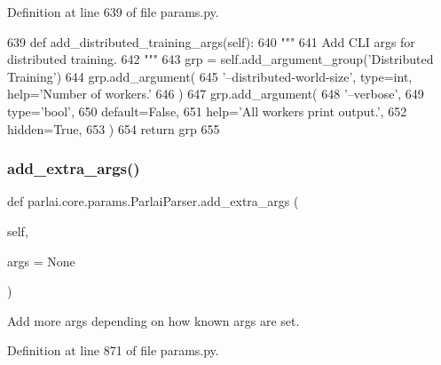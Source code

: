 Definition at line 639 of file params.\+py.


\begin{DoxyCode}
639     \textcolor{keyword}{def }add\_distributed\_training\_args(self):
640         \textcolor{stringliteral}{"""}
641 \textcolor{stringliteral}{        Add CLI args for distributed training.}
642 \textcolor{stringliteral}{        """}
643         grp = self.add\_argument\_group(\textcolor{stringliteral}{'Distributed Training'})
644         grp.add\_argument(
645             \textcolor{stringliteral}{'--distributed-world-size'}, type=int, help=\textcolor{stringliteral}{'Number of workers.'}
646         )
647         grp.add\_argument(
648             \textcolor{stringliteral}{'--verbose'},
649             type=\textcolor{stringliteral}{'bool'},
650             default=\textcolor{keyword}{False},
651             help=\textcolor{stringliteral}{'All workers print output.'},
652             hidden=\textcolor{keyword}{True},
653         )
654         \textcolor{keywordflow}{return} grp
655 
\end{DoxyCode}
\mbox{\label{classparlai_1_1core_1_1params_1_1ParlaiParser_ade9c068595c2b1110d019f3dedeb79ba}} 
\subsubsection{\texorpdfstring{add\+\_\+extra\+\_\+args()}{add\_extra\_args()}}
{\footnotesize\ttfamily def parlai.\+core.\+params.\+Parlai\+Parser.\+add\+\_\+extra\+\_\+args (\begin{DoxyParamCaption}\item[{}]{self,  }\item[{}]{args = {\ttfamily None} }\end{DoxyParamCaption})}

\begin{DoxyVerb}Add more args depending on how known args are set.
\end{DoxyVerb}
 

Definition at line 871 of file params.\+py.


